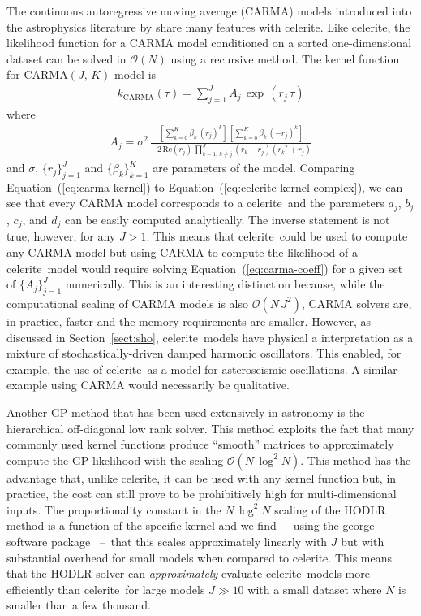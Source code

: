 \documentclass[manuscript, letterpaper]{aastex6}
\newcommand{\project}[1]{\textsf{#1}}
\newcommand{\celerite}{\project{celerite}}
\renewcommand{\eqref}[1]{\ref{eq:#1}}
\newcommand{\Eq}[1]{Equation~(\eqref{#1})}
\newcommand{\eq}[1]{\Eq{#1}}
\newcommand{\eqlabel}[1]{\label{eq:#1}}
\newcommand{\sectionname}{Section}
\newcommand{\sectref}[1]{\ref{sect:#1}}
\newcommand{\Sect}[1]{\sectionname~\sectref{#1}}
\newcommand{\sect}[1]{\Sect{#1}}
\begin{document}
The continuous autoregressive moving average (CARMA) models introduced into
the astrophysics literature by \citet{Kelly:2014} share many features with
\celerite.
Like \celerite, the likelihood function for a CARMA model conditioned on a
sorted one-dimensional dataset can be solved in $\mathcal{O}(N)$ using a
recursive method.
The kernel function for CARMA$(J,\,K)$ model is \citep{Kelly:2014}
\begin{eqnarray}\eqlabel{carma-kernel}
k_\mathrm{CARMA}(\tau) = \sum_{j=1}^J A_j\,\exp\,(r_j\,\tau)
\end{eqnarray}
where
\begin{eqnarray}\eqlabel{carma-coeff}
A_j = \sigma^2 \,\frac{\left[\sum_{k=0}^K\beta_k\,{(r_j)}^k\right]\,
    \left[\sum_{k=0}^K\beta_k\,{(-r_j)}^k\right]}
    {-2\,\mathrm{Re}(r_j)\,\prod_{k=1,\,k \ne j}^{J}(r_k-r_j)({r_k}^*+r_j)}
\end{eqnarray}
and $\sigma$, $\{r_j\}_{j=1}^J$ and $\{\beta_k\}_{k=1}^K$ are parameters of
the model.
Comparing \eq{carma-kernel} to \eq{celerite-kernel-complex}, we can see that
every CARMA model corresponds to a \celerite\ and the parameters $a_j$, $b_j$,
$c_j$, and $d_j$ can be easily computed analytically.
The inverse statement is not true, however, for any $J > 1$.
This means that \celerite\ could be used to compute any CARMA model but using
CARMA to compute the likelihood of a \celerite\ model would require solving
\eq{carma-coeff} for a given set of $\{A_j\}_{j=1}^J$ numerically.
This is an interesting distinction because, while the computational scaling of
CARMA models is also $\mathcal{O}(N\,J^2)$, CARMA solvers are, in practice,
faster and the memory requirements are smaller.
However, as discussed in \sect{sho}, \celerite\ models have physical a
interpretation as a mixture of stochastically-driven damped harmonic
oscillators.
This enabled, for example, the use of \celerite\ as a model for asteroseismic
oscillations.
A similar example using CARMA would necessarily be qualitative.

Another GP method that has been used extensively in astronomy is the
hierarchical off-diagonal low rank \citep[HODLR,][]{Ambikasaran:2016} solver.
This method exploits the fact that many commonly used kernel functions produce
``smooth'' matrices to approximately compute the GP likelihood with the
scaling $\mathcal{O}(N\,\log^2 N)$.
This method has the advantage that, unlike \celerite, it can be used with any
kernel function but, in practice, the cost can still prove to be prohibitively
high for multi-dimensional inputs.
The proportionality constant in the $N\,\log^2N$ scaling of the HODLR method
is a function of the specific kernel and we find~--~using the \project{george}
software package \citep{Foreman-Mackey:2014, Ambikasaran:2016}~--~that this
scales approximately linearly with $J$ but with substantial overhead for small
models when compared to \celerite.
This means that the HODLR solver can \emph{approximately} evaluate \celerite\
models more efficiently than \celerite\ for large models $J \gg 10$ with a
small dataset where $N$ is smaller than a few thousand.
\end{document}
